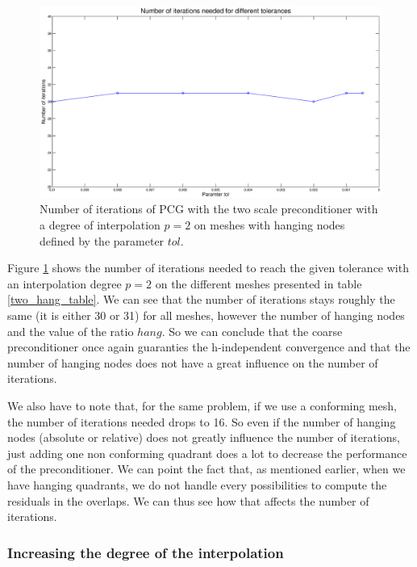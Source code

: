 \begin{figure}
\centering
\includegraphics[scale=0.35]{Results/two_hang_iter.eps}
\caption{Number of iterations of PCG with the two scale preconditioner with a degree of interpolation $p=2$ on meshes with hanging nodes defined by the parameter $tol$.}
\label{two_hang_iter}
\end{figure}


Figure \ref{two_hang_iter} shows the number of iterations needed to reach the given tolerance with an interpolation degree $p=2$ on the different meshes presented in table \ref{two_hang_table}. We can see that the number of iterations stays roughly the same (it is either 30 or 31) for all meshes, however the number of hanging nodes and the value of the ratio $hang$. So we can conclude that the coarse preconditioner once again guaranties the h-independent convergence and that the number of hanging nodes does not have a great influence on the number of iterations. 

We also have to note that, for the same problem, if we use a conforming mesh, the number of iterations needed drops to 16. So even if the number of hanging nodes (absolute or relative) does not greatly influence the number of iterations, just adding one non conforming quadrant does a lot to decrease the performance of the preconditioner. We can point the fact that, as mentioned earlier, when we have hanging quadrants, we do not handle every possibilities to compute the residuals in the overlaps. We can thus see how that affects the number of iterations. 


\subsubsection{Increasing the degree of the interpolation}

